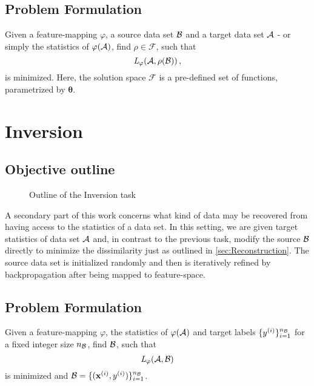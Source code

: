\subsection{Problem Formulation}
Given a feature-mapping $\varphi$, a source data set $\mathcal B$ and a target data set $\mathcal A$ - or simply the statistics of $\varphi(\mathcal A)$,  find $\rho \in \mathcal{F}$, such that
\[
     \textit{L} _\varphi (\mathcal A, \rho(\mathcal B)) \,,
\]
is minimized.
Here, the solution space $\mathcal F$ is a pre-defined set of functions, 
parametrized by $\boldsymbol \theta$.






\section{Inversion}
\label{sec:Inversion}

\subsection{Objective outline}

\begin{figure}[h]
    \centering
    
    \caption{Outline of the Inversion task}
    \label{fig:inversion_outline}
    \centering
\end{figure}

A secondary part of this work concerns what kind of data 
may be recovered from having access to the statistics of a data set.
In this setting, we are given target statistics of data set $\mathcal A$
and, in contrast to the previous task, modify the source $\mathcal B$ directly to 
minimize the dissimilarity just as outlined in \ref{sec:Reconstruction}.
The source data set is initialized randomly and then is 
iteratively refined by backpropagation after being mapped to feature-space.



\subsection{Problem Formulation}
Given a feature-mapping $\varphi$, the statistics of $\varphi(\mathcal A)$
and target labels $\{y^{(i)}\}_{i=1}^{n_{\mathcal B}}$ for a fixed integer size $n_{\mathcal B}$,
find $\mathcal B$, such that
\[
     \textit{L} _\varphi (\mathcal A, \mathcal B)
\]
is minimized and $\mathcal B = \{(\mathbf x^{(i)}, y^{(i)})\}_{i=1}^{n_{\mathcal B}}$.


